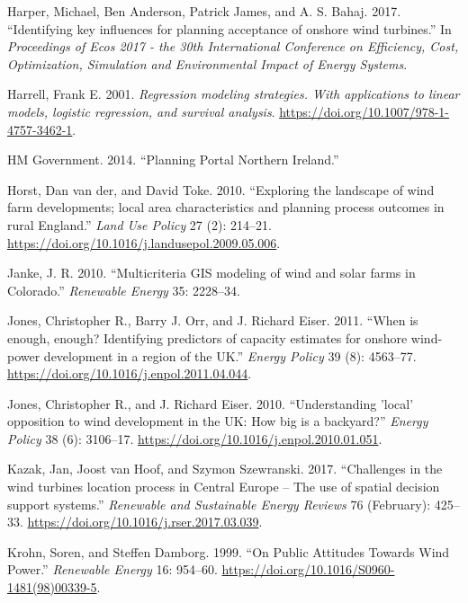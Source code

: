 \documentclass[a4paper,]{article}
\theoremstyle{definition}
\theoremstyle{definition}
\theoremstyle{definition}
\theoremstyle{remark}
\begin{document}
\leavevmode\hypertarget{ref-Harper2017}{}%
Harper, Michael, Ben Anderson, Patrick James, and A. S. Bahaj. 2017.
``Identifying key influences for planning acceptance of onshore wind
turbines.'' In \emph{Proceedings of Ecos 2017 - the 30th International
Conference on Efficiency, Cost, Optimization, Simulation and
Environmental Impact of Energy Systems}.

\leavevmode\hypertarget{ref-Harrell2001}{}%
Harrell, Frank E. 2001. \emph{Regression modeling strategies. With
applications to linear models, logistic regression, and survival
analysis}. \url{https://doi.org/10.1007/978-1-4757-3462-1}.

\leavevmode\hypertarget{ref-HMGovernment2014}{}%
HM Government. 2014. ``Planning Portal Northern Ireland.''

\leavevmode\hypertarget{ref-VanderHorst2010}{}%
Horst, Dan van der, and David Toke. 2010. ``Exploring the landscape of
wind farm developments; local area characteristics and planning process
outcomes in rural England.'' \emph{Land Use Policy} 27 (2): 214--21.
\url{https://doi.org/10.1016/j.landusepol.2009.05.006}.

\leavevmode\hypertarget{ref-Janke2010}{}%
Janke, J. R. 2010. ``Multicriteria GIS modeling of wind and solar farms
in Colorado.'' \emph{Renewable Energy} 35: 2228--34.

\leavevmode\hypertarget{ref-Jones2011}{}%
Jones, Christopher R., Barry J. Orr, and J. Richard Eiser. 2011. ``When
is enough, enough? Identifying predictors of capacity estimates for
onshore wind-power development in a region of the UK.'' \emph{Energy
Policy} 39 (8): 4563--77.
\url{https://doi.org/10.1016/j.enpol.2011.04.044}.

\leavevmode\hypertarget{ref-Jones2010}{}%
Jones, Christopher R., and J. Richard Eiser. 2010. ``Understanding
'local' opposition to wind development in the UK: How big is a
backyard?'' \emph{Energy Policy} 38 (6): 3106--17.
\url{https://doi.org/10.1016/j.enpol.2010.01.051}.

\leavevmode\hypertarget{ref-Kazak2017}{}%
Kazak, Jan, Joost van Hoof, and Szymon Szewranski. 2017. ``Challenges in
the wind turbines location process in Central Europe -- The use of
spatial decision support systems.'' \emph{Renewable and Sustainable
Energy Reviews} 76 (February): 425--33.
\url{https://doi.org/10.1016/j.rser.2017.03.039}.

\leavevmode\hypertarget{ref-Krohn1999}{}%
Krohn, Soren, and Steffen Damborg. 1999. ``On Public Attitudes Towards
Wind Power.'' \emph{Renewable Energy} 16: 954--60.
\url{https://doi.org/10.1016/S0960-1481(98)00339-5}.
\end{document}
